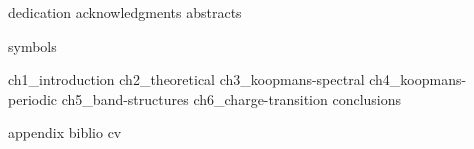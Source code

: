\documentclass[a4paper,11pt]{book}
\begin{document}
\setlength{\parindent}{0pt}
\setlength{\parskip}{0pt} %
\frontmatter


{dedication}
\setcounter{page}{0}
{acknowledgments}
{abstracts}

\cleardoublepage
{}
{\hypersetup{hidelinks} \tableofcontents}

\cleardoublepage
{}
{}
\listoffigures
 
\cleardoublepage
{}
{}
\listoftables

\cleardoublepage
{}
{symbols}

\setlength{\parskip}{1em}


\mainmatter
%
{ch1_introduction}
\cleardoublepage
%
{ch2_theoretical}
\cleardoublepage
%
{ch3_koopmans-spectral}
\cleardoublepage
%
{ch4_koopmans-periodic}
\cleardoublepage
%
{ch5_band-structures}
\cleardoublepage
%
{ch6_charge-transition}
\cleardoublepage
%
{conclusions}
\cleardoublepage

\cleardoublepage
{}


{appendix}
\backmatter
{biblio}
{cv}
\end{document}
